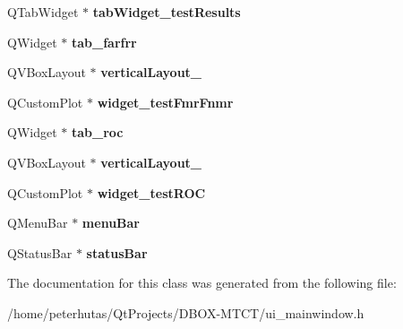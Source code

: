 \begin{DoxyCompactItemize}
\mbox{\label{class_ui___main_window_ac795a4c93ac145275f142acd148f5ce8}} 
Q\+Tab\+Widget $\ast$ {\bfseries tab\+Widget\+\_\+test\+Results}
\item 
\mbox{\label{class_ui___main_window_abb7fab86f3b2cb8931ba93844dcfd036}} 
Q\+Widget $\ast$ {\bfseries tab\+\_\+farfrr}
\item 
\mbox{\label{class_ui___main_window_a73167f8ba1b7ab11acea316a893a717a}} 
Q\+V\+Box\+Layout $\ast$ {\bfseries vertical\+Layout\+\_}
\item 
\mbox{\label{class_ui___main_window_a7f597012e363bdd7bf06c8895b0adef0}} 
Q\+Custom\+Plot $\ast$ {\bfseries widget\+\_\+test\+Fmr\+Fnmr}
\item 
\mbox{\label{class_ui___main_window_a27418d8111e49d597860ae1d544db098}} 
Q\+Widget $\ast$ {\bfseries tab\+\_\+roc}
\item 
\mbox{\label{class_ui___main_window_a1b3a62c857fb43de0dc4541bdb9eacbd}} 
Q\+V\+Box\+Layout $\ast$ {\bfseries vertical\+Layout\+\_}
\item 
\mbox{\label{class_ui___main_window_a04ccd76b647f18be32c072a6395d1bf4}} 
Q\+Custom\+Plot $\ast$ {\bfseries widget\+\_\+test\+R\+OC}
\item 
\mbox{\label{class_ui___main_window_a2be1c24ec9adfca18e1dcc951931457f}} 
Q\+Menu\+Bar $\ast$ {\bfseries menu\+Bar}
\item 
\mbox{\label{class_ui___main_window_a50fa481337604bcc8bf68de18ab16ecd}} 
Q\+Status\+Bar $\ast$ {\bfseries status\+Bar}
\end{DoxyCompactItemize}


The documentation for this class was generated from the following file\+:\begin{DoxyCompactItemize}
\item 
/home/peterhutas/\+Qt\+Projects/\+D\+B\+O\+X-\/\+M\+T\+C\+T/ui\+\_\+mainwindow.\+h\end{DoxyCompactItemize}
